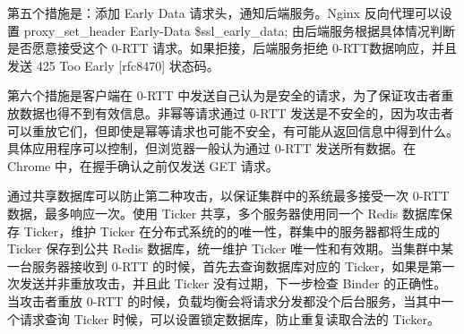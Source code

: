 第五个措施是：添加 Early Data 请求头，通知后端服务。Nginx 反向代理可以设置 proxy\_set\_header Early-Data \$ssl\_early\_data; 由后端服务根据具体情况判断是否愿意接受这个 0-RTT 请求。如果拒接，后端服务拒绝 0-RTT数据响应，并且发送 425 Too Early [rfc8470] 状态码。

第六个措施是客户端在 0-RTT 中发送自己认为是安全的请求，为了保证攻击者重放数据也得不到有效信息。非幂等请求通过 0-RTT 发送是不安全的，因为攻击者可以重放它们，但即使是幂等请求也可能不安全，有可能从返回信息中得到什么。具体应用程序可以控制，但浏览器一般认为通过 0-RTT 发送所有数据。在 Chrome 中，在握手确认之前仅发送 GET 请求。

通过共享数据库可以防止第二种攻击，以保证集群中的系统最多接受一次 0-RTT 数据，最多响应一次。使用 Ticker 共享，多个服务器使用同一个 Redis 数据库保存 Ticker，维护 Ticker 在分布式系统的的唯一性，群集中的服务器都将生成的 Ticker 保存到公共 Redis 数据库，统一维护 Ticker 唯一性和有效期。当集群中某一台服务器接收到 0-RTT 的时候，首先去查询数据库对应的 Ticker，如果是第一次发送并非重放攻击，并且此 Ticker 没有过期，下一步检查 Binder 的正确性。当攻击者重放 0-RTT 的时候，负载均衡会将请求分发都没个后台服务，当其中一个请求查询 Ticker 时候，可以设置锁定数据库，防止重复读取合法的 Ticker。


